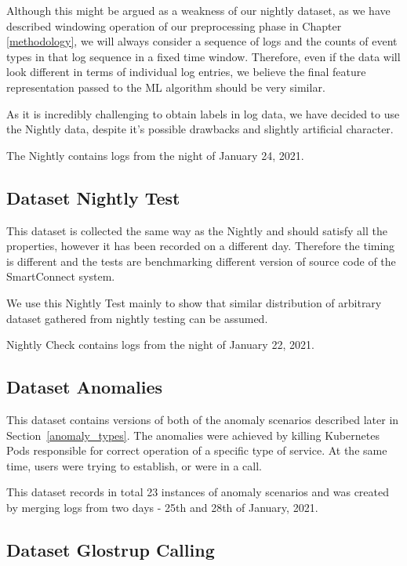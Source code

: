 Although this might be argued as a weakness of our nightly dataset, as we have described windowing operation of our preprocessing phase in Chapter \ref{methodology}, we will always consider a sequence of logs and the counts of event types in that log sequence in a fixed time window. Therefore, even if the data will look different in terms of individual log entries, we believe the final feature representation passed to the ML algorithm should be very similar.

As it is incredibly challenging to obtain labels in log data, we have decided to use the Nightly data, despite it's possible drawbacks and slightly artificial character.

The Nightly contains logs from the night of January 24, 2021.

\subsection{Dataset Nightly Test}
This dataset is collected the same way as the Nightly and should satisfy all the properties, however it has been recorded on a different day. Therefore the timing is different and the tests are benchmarking different version of source code of the SmartConnect system.

We use this Nightly Test mainly to show that similar distribution of arbitrary dataset gathered from nightly testing can be assumed.

Nightly Check contains logs from the night of January 22, 2021.

\subsection{Dataset Anomalies}

This dataset contains versions of both of the anomaly scenarios described later in Section~\ref{anomaly_types}. 
The anomalies were achieved by killing Kubernetes Pods responsible for correct operation of a specific type of service. 
At the same time, users were trying to establish, or were in a call.

This dataset records in total 23 instances of anomaly scenarios and was created by merging logs from two days - 25th and 28th of January, 2021.

\subsection{Dataset Glostrup Calling}

